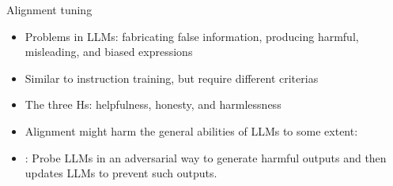 \documentclass[10pt]{beamer}
\begin{document}
\begin{frame}{Alignment tuning}


\begin{itemize}
\item Problems in LLMs: fabricating false information, producing harmful, misleading, and biased expressions
\item Similar to instruction training, but require different criterias
\item The three Hs: helpfulness, honesty, and harmlessness
\item Alignment might harm the general abilities of LLMs to some extent: %
\item {}: Probe LLMs in an adversarial way to generate harmful outputs and then updates LLMs to prevent such outputs.

\end{itemize}

\end{frame}
\end{document}

